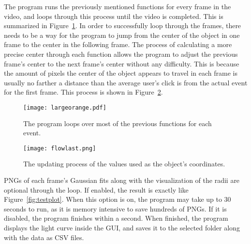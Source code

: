 The program runs the previously mentioned functions for every frame in the video, and loops through this process until the video is completed. This is summarized in Figure~\ref{fig:moreflow}. In order to successfully loop through the frames, there needs to be a way for the program to jump from the center of the object in one frame to the center in the following frame. The process of calculating a more precise center through each function allows the program to adjust the previous frame's center to the next frame's center without any difficulty. This is because the amount of pixels the center of the object appears to travel in each frame is usually no farther a distance than the average user's click is from the actual event for the first frame. This process is shown in Figure~\ref{fig:updatingxy}.

\begin{figure}[ht!]
	\centering
	\texttt{[image: largeorange.pdf]}
	\caption{The program loops over most of the previous functions for each event.}
	\label{fig:moreflow}
\end{figure}

\begin{figure}[htpb]
	\centering
	\texttt{[image: flowlast.png]}
	\caption{The updating process of the values used as the object's coordinates.}
	\label{fig:updatingxy}
\end{figure}

PNGs of each frame's Gaussian fits along with the visualization of the radii are optional through the loop. If enabled, the result is exactly like Figure~\ref{fig:testplot}. When this option is on, the program may take up to 30 seconds to run, as it is memory intensive to save hundreds of PNGs. If it is disabled, the program finishes within a second. When finished, the program displays the light curve inside the GUI, and saves it to the selected folder along with the data as CSV files.
